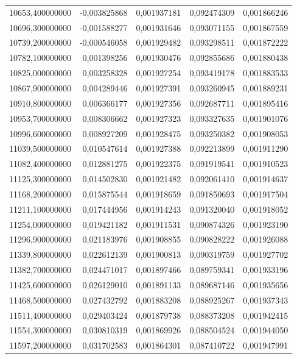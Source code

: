 \begin{longtable}{rrrrr}
10653,400000000 & -0,003825868 & 0,001937181 & 0,092474309 & 0,001866246\\
10696,300000000 & -0,001588277 & 0,001931646 & 0,093071155 & 0,001867559\\
10739,200000000 & -0,000546058 & 0,001929482 & 0,093298511 & 0,001872222\\
10782,100000000 & 0,001398256 & 0,001930476 & 0,092855686 & 0,001880438\\
10825,000000000 & 0,003258328 & 0,001927254 & 0,093419178 & 0,001883533\\
10867,900000000 & 0,004289446 & 0,001927391 & 0,093260945 & 0,001889231\\
10910,800000000 & 0,006366177 & 0,001927356 & 0,092687711 & 0,001895416\\
10953,700000000 & 0,008306662 & 0,001927323 & 0,093327635 & 0,001901076\\
10996,600000000 & 0,008927209 & 0,001928475 & 0,093250382 & 0,001908053\\
11039,500000000 & 0,010547614 & 0,001927388 & 0,092213899 & 0,001911290\\
11082,400000000 & 0,012881275 & 0,001922375 & 0,091919541 & 0,001910523\\
11125,300000000 & 0,014502830 & 0,001921482 & 0,092061410 & 0,001914637\\
11168,200000000 & 0,015875544 & 0,001918659 & 0,091850693 & 0,001917504\\
11211,100000000 & 0,017444956 & 0,001914243 & 0,091320040 & 0,001918052\\
11254,000000000 & 0,019421182 & 0,001911531 & 0,090874326 & 0,001923190\\
11296,900000000 & 0,021183976 & 0,001908855 & 0,090828222 & 0,001926088\\
11339,800000000 & 0,022612139 & 0,001900813 & 0,090319759 & 0,001927702\\
11382,700000000 & 0,024471017 & 0,001897466 & 0,089759341 & 0,001933196\\
11425,600000000 & 0,026129010 & 0,001891133 & 0,089687146 & 0,001935656\\
11468,500000000 & 0,027432792 & 0,001883208 & 0,088925267 & 0,001937343\\
11511,400000000 & 0,029403424 & 0,001879738 & 0,088373208 & 0,001942415\\
11554,300000000 & 0,030810319 & 0,001869926 & 0,088504524 & 0,001944050\\
11597,200000000 & 0,031702583 & 0,001864301 & 0,087410722 & 0,001947991\\

\end{longtable}
